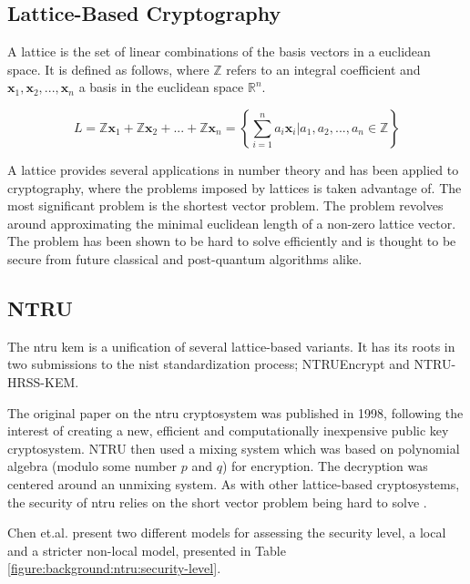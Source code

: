 \subsection{Lattice-Based Cryptography}

A lattice is the set of linear combinations of the basis vectors in a euclidean space. It is defined as follows, where $\mathbb{Z}$ refers to an integral coefficient and $\mathbf{x}_1,\mathbf{x}_2,...,\mathbf{x}_n$ a basis in the euclidean space $\mathbb{R}^n$\cite{bremner2012}.

$$
L=\mathbb{Z}\mathbf{x}_1+\mathbb{Z}\mathbf{x}_2+...+\mathbb{Z}\mathbf{x}_n=\left\{\sum_{i=1}^n a_i\mathbf{x}_i|a_1,a_2,...,a_n\in\mathbb{Z}\right\}
$$

\noindent A lattice provides several applications in number theory and has been applied to cryptography, where the problems imposed by lattices is taken advantage of\cite{bremner2012}. The most significant problem is the shortest vector problem. The problem revolves around approximating the minimal euclidean length of a non-zero lattice vector. The problem has been shown to be hard to solve efficiently and is thought to be secure from future classical and post-quantum algorithms alike\cite{sun2020}.

\subsection{NTRU}

The \gls{ntru} \gls{kem} is a unification of several lattice-based variants. It has its roots in two submissions to the \gls{nist} standardization process; NTRUEncrypt and NTRU-HRSS-KEM.

The original paper on the \gls{ntru} cryptosystem was published in 1998, following the interest of creating a new, efficient and computationally inexpensive public key cryptosystem\cite{ntru1998}. NTRU then used a mixing system which was based on polynomial algebra (modulo some number $p$ and $q$) for encryption. The decryption was centered around an unmixing system. As with other lattice-based cryptosystems, the security of \gls{ntru} relies on the short vector problem being hard to solve \cite{sun2020, ntru1998}.

Chen et.al. \cite{ntru2020} present two different models for assessing the security level, a local and a stricter non-local model, presented in Table \ref{figure:background:ntru:security-level}.

